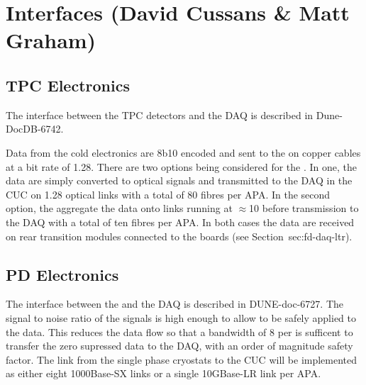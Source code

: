 
\section{Interfaces (David Cussans \& Matt Graham)}
\label{sec:fd-daq-intfc}



\subsection{TPC Electronics}
\label{sec:fd-daq-intfc-elec}

The interface between the  TPC detectors and the DAQ is described in Dune-DocDB-6742.

Data from the cold electronics  are 8b10 encoded and sent
to the  on copper cables at a bit rate of
\SI{1.28}{\Gbps}. There are two options being considered for the
. In one, the data are simply converted to optical signals
and transmitted to the DAQ in the CUC on \SI{1.28}{\Gbps} optical
links with a total of 80 fibres per APA. In the second option, the
 aggregate the data onto links running at
$\approx$\SI{10}{\Gbps} before transmission to the DAQ with a total of
ten fibres per APA. In both cases the data are received on rear
transition modules connected to the   boards
(see Section~{sec:fd-daq-ltr}).



\subsection{PD Electronics}
\label{sec:fd-daq-intfc-photon}

The interface between the  
and the DAQ is described in DUNE-doc-6727. The signal to noise ratio
of the  signals is high enough to allow  to be safely applied to the data. This reduces the data flow so that a bandwidth of
\SI{8}{\Gbps} per  is sufficent to transfer the zero supressed data to
the DAQ, with an order of magnitude safety factor. The link from the
single phase cryostats to the CUC will be implemented as either eight
1000Base-SX links  or a single 10GBase-LR link per APA.

